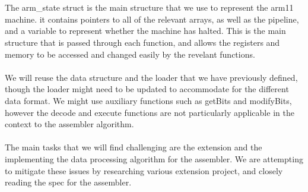 \documentclass[11pt]{article}
\begin{document}
\\~\\
The arm\_state struct is the main structure that we use to represent the arm11 machine. it contains pointers to all of the relevant arrays,
as well as the pipeline, and a variable to represent whether the machine has halted. This is the main structure that is passed through
each function, and allows the registers and memory to be accessed and changed easily by the revelant functions.
\\~\\
We will reuse the data structure and the loader that we have previously defined, though the loader might 
need to be updated to accommodate for the different data format. We might use auxiliary functions such as
getBits and modifyBits, however the decode and execute functions are not particularly applicable in the context to
the assembler algorithm.
\\~\\The main tasks that we will find challenging are the extension and the implementing the data processing
algorithm for the assembler. We are attempting to mitigate these issues by researching various extension project, and
closely reading the spec for the assembler. 
\end{document}
